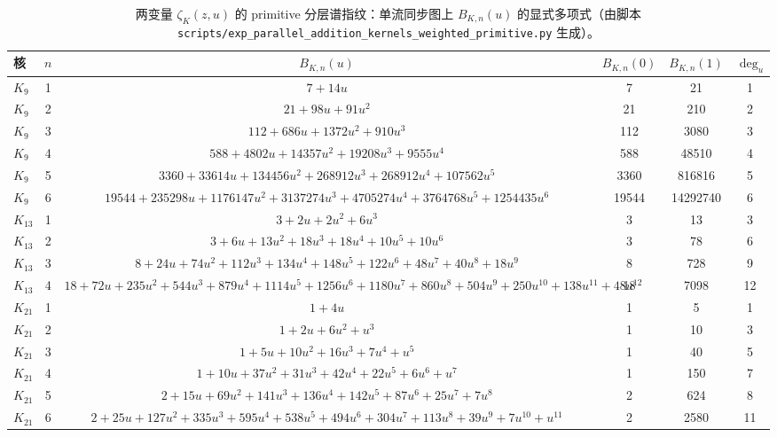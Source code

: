 \begin{table}[H]
\centering
\scriptsize
\setlength{\tabcolsep}{6pt}
\renewcommand{\arraystretch}{1.15}
\caption{两变量 $\zeta_K(z,u)$ 的 primitive 分层谱指纹：单流同步图上 $B_{K,n}(u)$ 的显式多项式（由脚本 \texttt{scripts/exp\_parallel\_addition\_kernels\_weighted\_primitive.py} 生成）。}
\label{tab:parallel-addition-kernels-weighted-primitive}
\begin{tabular}{@{}lccccc@{}}
\toprule
核 & $n$ & $B_{K,n}(u)$ & $B_{K,n}(0)$ & $B_{K,n}(1)$ & $\deg_u$ \\
\midrule
$K_{9}$ & 1 & $7+14u$ & 7 & 21 & 1 \\
$K_{9}$ & 2 & $21+98u+91u^{2}$ & 21 & 210 & 2 \\
$K_{9}$ & 3 & $112+686u+1372u^{2}+910u^{3}$ & 112 & 3080 & 3 \\
$K_{9}$ & 4 & $588+4802u+14357u^{2}+19208u^{3}+9555u^{4}$ & 588 & 48510 & 4 \\
$K_{9}$ & 5 & $3360+33614u+134456u^{2}+268912u^{3}+268912u^{4}+107562u^{5}$ & 3360 & 816816 & 5 \\
$K_{9}$ & 6 & $19544+235298u+1176147u^{2}+3137274u^{3}+4705274u^{4}+3764768u^{5}+1254435u^{6}$ & 19544 & 14292740 & 6 \\
$K_{13}$ & 1 & $3+2u+2u^{2}+6u^{3}$ & 3 & 13 & 3 \\
$K_{13}$ & 2 & $3+6u+13u^{2}+18u^{3}+18u^{4}+10u^{5}+10u^{6}$ & 3 & 78 & 6 \\
$K_{13}$ & 3 & $8+24u+74u^{2}+112u^{3}+134u^{4}+148u^{5}+122u^{6}+48u^{7}+40u^{8}+18u^{9}$ & 8 & 728 & 9 \\
$K_{13}$ & 4 & $18+72u+235u^{2}+544u^{3}+879u^{4}+1114u^{5}+1256u^{6}+1180u^{7}+860u^{8}+504u^{9}+250u^{10}+138u^{11}+48u^{12}$ & 18 & 7098 & 12 \\
$K_{21}$ & 1 & $1+4u$ & 1 & 5 & 1 \\
$K_{21}$ & 2 & $1+2u+6u^{2}+u^{3}$ & 1 & 10 & 3 \\
$K_{21}$ & 3 & $1+5u+10u^{2}+16u^{3}+7u^{4}+u^{5}$ & 1 & 40 & 5 \\
$K_{21}$ & 4 & $1+10u+37u^{2}+31u^{3}+42u^{4}+22u^{5}+6u^{6}+u^{7}$ & 1 & 150 & 7 \\
$K_{21}$ & 5 & $2+15u+69u^{2}+141u^{3}+136u^{4}+142u^{5}+87u^{6}+25u^{7}+7u^{8}$ & 2 & 624 & 8 \\
$K_{21}$ & 6 & $2+25u+127u^{2}+335u^{3}+595u^{4}+538u^{5}+494u^{6}+304u^{7}+113u^{8}+39u^{9}+7u^{10}+u^{11}$ & 2 & 2580 & 11 \\
\bottomrule
\end{tabular}
\end{table}
